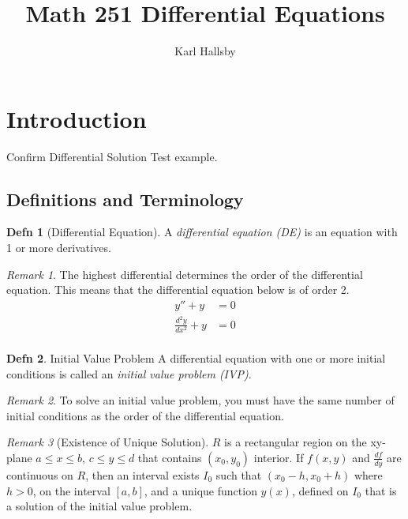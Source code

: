 \documentclass[10pt,letterpaper,final,twoside,notitlepage]{article}
\author{Karl Hallsby}
\title{Math 251 Differential Equations}
\theoremstyle{plain}
\theoremstyle{definition}
\newtheorem{definition}{Defn}
\theoremstyle{remark}
\newtheorem{remark}{Remark}[definition]
\begin{document}
\section{Introduction} \label{sec:Introduction}
	\begin{example}{Confirm Differential Solution}
		Test example.
	\end{example}
	\subsection{Definitions and Terminology} \label{subsec:Definitions and Terminology}
		\begin{definition}[Differential Equation] \label{def:Differential Equation}
			A \emph{differential equation (DE)} is an equation with 1 or more derivatives.
			\begin{remark}
				The highest differential determines the order of the differential equation.
				This means that the differential equation below is of order 2.
				\begin{align*} 
					y'' + y &= 0 \\
					\frac{d^{2}y}{dx^{2}} + y &= 0 \\
				\end{align*} 
			\end{remark}
		\end{definition}
		\begin{definition}{Initial Value Problem} \label{def:Initial Value Problem}
			A differential equation with one or more initial conditions is called an \emph{initial value problem (IVP)}.
			\begin{remark}
				To solve an initial value problem, you must have the same number of initial conditions as the order of the differential equation.
			\end{remark}
			\begin{remark}[Existence of Unique Solution]
				$R$ is a rectangular region on the xy-plane $a \leq x \leq b$, $c \leq y \leq d$ that contains $\left( x_{0}, y_{0} \right)$ interior.
				If $f \left( x,y \right)$ and $\frac{df}{dy}$ are continuous on $R$, then an interval exists $I_{0}$ such that $\left( x_{0}-h, x_{0}+h \right)$ where $h>0$, on the interval $\left[ a,b \right]$, and a unique function $y \left( x \right)$, defined on $I_{0}$ that is a solution of the initial value problem.
			\end{remark}
		\end{definition}
	
\end{document}
